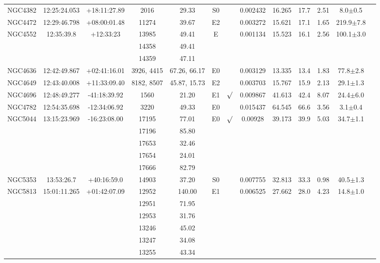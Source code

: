 \documentclass[iop]{emulateapj}
\begin{document}
\begin{table}
\begin{tabular}{lcccccccccccc}
NGC4382 & 12:25:24.053 & +18:11:27.89  & 2016 & 29.33  & S0 &          & 0.002432 & 16.265 & 17.7 & 2.51 & 8.0$\pm$0.5  \\
NGC4472 & 12:29:46.798 & +08:00:01.48 & 11274 & 39.67    & E2   &         & 0.003272 & 15.621 & 17.1  &  1.65 & 219.9$\pm$7.8\\
NGC4552 & 12:35:39.8 & +12:33:23  & 13985 & 49.41 & E  &           & 0.001134 & 15.523 & 16.1 & 2.56 & 100.1$\pm$3.0 \\
        & && 14358 & 49.41 & \\
        & && 14359 & 47.11 & \\
NGC4636 & 12:42:49.867 & +02:41:16.01 & 3926, 4415  & 67.26, 66.17    & E0   &         & 0.003129 & 13.335 & 13.4  &  1.83 & 77.8$\pm$2.8 \\
NGC4649 & 12:43:40.008 & +11:33:09.40 & 8182, 8507  & 45.87, 15.73    & E2   &         & 0.003703 & 15.767 & 15.9  &  2.13 & 29.1$\pm$1.3 \\
NGC4696 & 12:48:49.277 & -41:18:39.92 & 1560  & 21.20 & E1 & $\surd$ & 0.009867 & 41.613 & 42.4 & 8.07 & 24.4$\pm$6.0 \\
NGC4782 & 12:54:35.698 & -12:34:06.92 & 3220 & 49.33 & E0 &          & 0.015437 & 64.545 & 66.6 & 3.56 & 3.1$\pm$0.4 \\
NGC5044 & 13:15:23.969 & -16:23:08.00 & 17195 & 77.01    & E0   & $\surd$ & 0.00928  & 39.173 & 39.9  &  5.03 & 34.7$\pm$1.1  \\
        &          &          & 17196 & 85.80    &      &         \\
        &          &          & 17653 & 32.46    &      &         \\
        &          &          & 17654 & 24.01    & \\
        &          &          & 17666 & 82.79    & \\
NGC5353 & 13:53:26.7 & +40:16:59.0 & 14903 & 37.20 & S0 &            & 0.007755 & 32.813 & 33.3 & 0.98 & 40.5$\pm$1.3 \\
NGC5813 & 15:01:11.265 & +01:42:07.09 & 12952 & 140.00 & E1 &        & 0.006525 & 27.662 & 28.0 & 4.23 & 14.8$\pm$1.0 \\
        &          &          & 12951 & 71.95    &  \\
        &          &          & 12953 & 31.76    & \\
        &          &          & 13246 & 45.02    & \\
        &          &          & 13247 & 34.08    & \\
        &          &          & 13255 & 43.34    & \\

\end{tabular}
\end{table}
\end{document}

